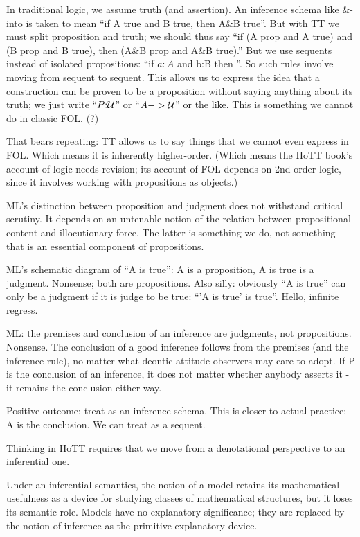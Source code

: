 \documentclass{article}
\begin{document}
In traditional logic, we assume truth (and assertion).  An inference
schema like \&-into is taken to mean ``if A true and B true, then A\&B
true''.  But with TT we must split proposition and truth; we should
thus say ``if (A prop and A true) and (B prop and B true), then (A\&B
prop and A\&B true).''  But we use sequents instead of isolated
propositions: ``if \(a{:}A\) and b{:}B then \abAB''.  So such
rules involve moving from sequent to sequent.  This allows us to
express the idea that a construction can be proven to be a proposition
without saying anything about its truth; we just write
``\(P{:}\mathcal{U}\)'' or ``\(A->\mathcal{U}\)'' or the like.  This is something
we cannot do in classic FOL. (?)

That bears repeating: TT allows us to say things that we cannot even
express in FOL.  Which means it is inherently higher-order.  (Which
means the HoTT book's account of logic needs revision; its account of
FOL depends on 2nd order logic, since it involves working with
propositions as objects.)

ML's distinction  between proposition and judgment  does not withstand
critical scrutiny.  It depends on  an untenable notion of the relation
between propositional content and  illocutionary force.  The latter is
something  we do,  not something  that  is an  essential component  of
propositions.

ML's schematic diagram of ``A is true'': A is a proposition, A is true
is a judgment.  Nonsense; both are propositions.  Also silly:
obviously ``A is true'' can only be a judgment if it is judge to be
true: ``'A is true' is true''.  Hello, infinite regress.

ML: the premises and conclusion of an inference are judgments, not
propositions.  Nonsense.  The conclusion of a good inference follows
from the premises (and the inference rule), no matter what deontic
attitude observers may care to adopt.  If P is the conclusion of an
inference, it does not matter whether anybody asserts it - it remains
the conclusion either way.

Positive outcome: treat \aA as an inference schema.  This is closer to
actual practice: A is the conclusion.  We can treat \aA as a sequent.

Thinking in HoTT requires that we move from a denotational perspective
to an inferential one.

Under an inferential semantics, the notion of a model retains its
mathematical usefulness as a device for studying classes of
mathematical structures, but it loses its semantic role.  Models have
no explanatory significance; they are replaced by the notion of
inference as the primitive explanatory device.
\end{document}
